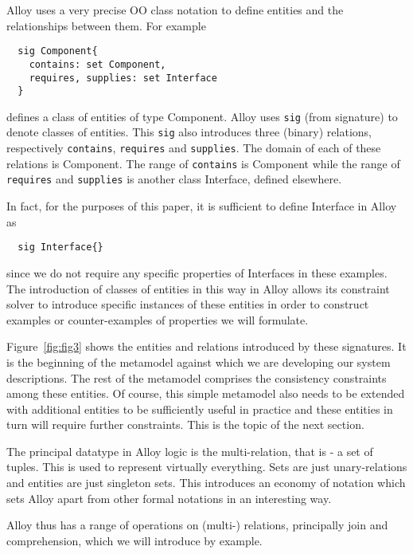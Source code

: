 \documentclass[a4paper,twoside]{article}
\begin{document}
Alloy uses a very precise OO class notation to define entities and the relationships between them. For example 
\begin{small}
\begin{verbatim}
  sig Component{
    contains: set Component,
    requires, supplies: set Interface
  }\end{verbatim}
\end{small}
defines a class of entities of type Component. Alloy uses {\small\verb$sig$} (from signature) to denote classes of entities. This {\small\verb$sig$} also introduces three (binary) relations, respectively {\small\verb$contains$}, {\small\verb$requires$} and {\small\verb$supplies$}. The domain of each of these relations is Component. The range of {\small\verb$contains$} is Component while the range of {\small\verb$requires$} and {\small\verb$supplies$} is another class Interface, defined elsewhere.

In fact, for the purposes of this paper, it is sufficient to define Interface in Alloy as 
\begin{small}
\begin{verbatim}
  sig Interface{}
\end{verbatim}
\end{small}
since we do not require any specific properties of Interfaces in these examples. The introduction of classes of entities in this way in Alloy allows its constraint solver to introduce specific instances of these entities in order to construct examples or counter-examples of properties we will formulate.

Figure~\ref{fig:fig3} shows the entities and relations introduced by these signatures. It is the beginning of the metamodel against which we are developing our system descriptions. The rest of the metamodel comprises the consistency constraints among these entities. Of course, this simple metamodel also needs to be extended with additional entities to be sufficiently useful in practice and these entities in turn will require further constraints. This is the topic of the next section.

The principal datatype in Alloy logic is the multi-relation, that is - a set of tuples. This is used to represent virtually everything. Sets are just unary-relations and entities are just singleton sets. This introduces an economy of notation which sets Alloy apart from other formal notations in an interesting way. 

Alloy thus has a range of operations on (multi-) relations, principally join and comprehension, which we will introduce by example.
\end{document}
